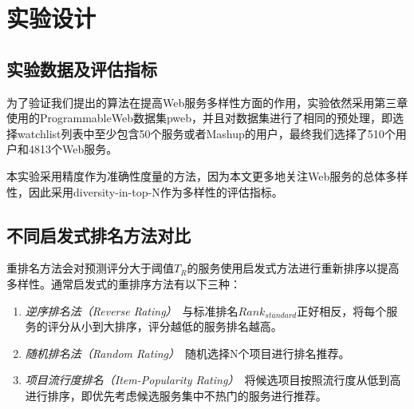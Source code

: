 \documentclass[master,winfonts]{njuthesis}
\begin{document}
\section{实验设计}
\subsection{实验数据及评估指标}
为了验证我们提出的算法在提高Web服务多样性方面的作用，实验依然采用第三章使用的ProgrammableWeb数据集pweb，并且对数据集进行了相同的预处理，即选择watchlist列表中至少包含50个服务或者Mashup的用户，最终我们选择了510个用户和4813个Web服务。

本实验采用精度作为准确性度量的方法，因为本文更多地关注Web服务的总体多样性，因此采用diversity-in-top-N\cite{Ge2010Beyond}作为多样性的评估指标。


\subsection{不同启发式排名方法对比}
重排名方法会对预测评分大于阈值$T_R$的服务使用启发式方法进行重新排序以提高多样性。通常启发式的重排序方法有以下三种：
\begin{enumerate}
\item \emph{逆序排名法（Reverse Rating）}~与标准排名$Rank_{standard}$正好相反，将每个服务的评分从小到大排序，评分越低的服务排名越高。

\item \emph{随机排名法（Random Rating）}~随机选择N个项目进行排名推荐。

\item \emph{项目流行度排名（Item-Popularity Rating）}~将候选项目按照流行度从低到高进行排序，即优先考虑候选服务集中不热门的服务进行推荐。
\end{enumerate}
\end{document}
